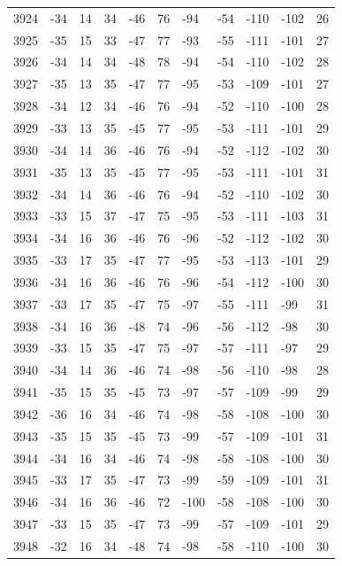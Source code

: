 \begin{table}[H]
\begin{tabular}{lllllllllll}
3924 & -34 & 14 & 34 & -46 & 76 & -94 & -54 & -110 & -102 & 26 \\
3925 & -35 & 15 & 33 & -47 & 77 & -93 & -55 & -111 & -101 & 27 \\
3926 & -34 & 14 & 34 & -48 & 78 & -94 & -54 & -110 & -102 & 28 \\
3927 & -35 & 13 & 35 & -47 & 77 & -95 & -53 & -109 & -101 & 27 \\
3928 & -34 & 12 & 34 & -46 & 76 & -94 & -52 & -110 & -100 & 28 \\
3929 & -33 & 13 & 35 & -45 & 77 & -95 & -53 & -111 & -101 & 29 \\
3930 & -34 & 14 & 36 & -46 & 76 & -94 & -52 & -112 & -102 & 30 \\
3931 & -35 & 13 & 35 & -45 & 77 & -95 & -53 & -111 & -101 & 31 \\
3932 & -34 & 14 & 36 & -46 & 76 & -94 & -52 & -110 & -102 & 30 \\
3933 & -33 & 15 & 37 & -47 & 75 & -95 & -53 & -111 & -103 & 31 \\
3934 & -34 & 16 & 36 & -46 & 76 & -96 & -52 & -112 & -102 & 30 \\
3935 & -33 & 17 & 35 & -47 & 77 & -95 & -53 & -113 & -101 & 29 \\
3936 & -34 & 16 & 36 & -46 & 76 & -96 & -54 & -112 & -100 & 30 \\
3937 & -33 & 17 & 35 & -47 & 75 & -97 & -55 & -111 & -99 & 31 \\
3938 & -34 & 16 & 36 & -48 & 74 & -96 & -56 & -112 & -98 & 30 \\
3939 & -33 & 15 & 35 & -47 & 75 & -97 & -57 & -111 & -97 & 29 \\
3940 & -34 & 14 & 36 & -46 & 74 & -98 & -56 & -110 & -98 & 28 \\
3941 & -35 & 15 & 35 & -45 & 73 & -97 & -57 & -109 & -99 & 29 \\
3942 & -36 & 16 & 34 & -46 & 74 & -98 & -58 & -108 & -100 & 30 \\
3943 & -35 & 15 & 35 & -45 & 73 & -99 & -57 & -109 & -101 & 31 \\
3944 & -34 & 16 & 34 & -46 & 74 & -98 & -58 & -108 & -100 & 30 \\
3945 & -33 & 17 & 35 & -47 & 73 & -99 & -59 & -109 & -101 & 31 \\
3946 & -34 & 16 & 36 & -46 & 72 & -100 & -58 & -108 & -100 & 30 \\
3947 & -33 & 15 & 35 & -47 & 73 & -99 & -57 & -109 & -101 & 29 \\
3948 & -32 & 16 & 34 & -48 & 74 & -98 & -58 & -110 & -100 & 30 \\

\end{tabular}
\end{table}
